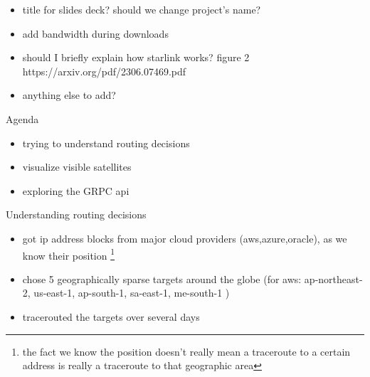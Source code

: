 \documentclass[NET,english,beameralt]{tumbeamer}
\begin{document}
\begin{frame}
    \begin{itemize}
        \item title for slides deck? should we change project's name?
        \item add bandwidth during downloads
        \item should I briefly explain how starlink works? figure 2 https://arxiv.org/pdf/2306.07469.pdf
        \item anything else to add?
    \end{itemize}
\end{frame}

\begin{frame}{Agenda}
    \begin{itemize}
        \item trying to understand routing decisions
        \item visualize visible satellites
        \item exploring the GRPC api
    \end{itemize}
\end{frame}
\begin{frame}{Understanding routing decisions}
    \begin{itemize}
        \item got ip address blocks from major cloud providers (aws,azure,oracle), as we know their position \footnote[]{the fact we know the position doesn't really mean a traceroute to a certain address is really a traceroute to that geographic area}
        \item chose 5 geographically sparse targets around the globe (for aws: ap-northeast-2, us-east-1, ap-south-1, sa-east-1, me-south-1 )
        \item tracerouted the targets over several days 
    \end{itemize}
\end{frame}
\end{document}
